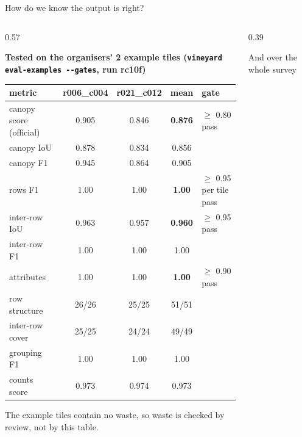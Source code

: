 \begin{frame}{How do we know the output is right?}
  \begin{columns}[T]
    \begin{column}{0.57\textwidth}
      {\scriptsize\bfseries\color{sxNight} Tested on the organisers' 2 example tiles (\texttt{vineyard eval-examples -{}-gates}, run rc10f)\par}
      \vspace{1mm}
      {\tiny
      \begin{tabular}{@{}l c c c l@{}}
        \toprule
        \textbf{metric} & \textbf{r006\_c004} & \textbf{r021\_c012} & \textbf{mean} & \textbf{gate}\\
        \midrule
        canopy score (official) & 0.905 & 0.846 & \textbf{0.876} & $\geq$ 0.80 \textcolor{sxTeal}{pass}\\
        canopy IoU              & 0.878 & 0.834 & 0.856 & \\
        canopy F1               & 0.945 & 0.864 & 0.905 & \\
        rows F1                 & 1.00 & 1.00 & \textbf{1.00} & $\geq$ 0.95 per tile \textcolor{sxTeal}{pass}\\
        inter-row IoU           & 0.963 & 0.957 & \textbf{0.960} & $\geq$ 0.95 \textcolor{sxTeal}{pass}\\
        inter-row F1            & 1.00 & 1.00 & 1.00 & \\
        attributes              & 1.00 & 1.00 & \textbf{1.00} & $\geq$ 0.90 \textcolor{sxTeal}{pass}\\
        \quad row structure     & 26/26 & 25/25 & 51/51 & \\
        \quad inter-row cover   & 25/25 & 24/24 & 49/49 & \\
        grouping F1             & 1.00 & 1.00 & 1.00 & \\
        counts score            & 0.973 & 0.974 & 0.973 & \\
        \bottomrule
      \end{tabular}\par}
      \vspace{1mm}
      {\tiny\color{sxGrey} The example tiles contain no waste, so waste is checked by review, not by this table.\par}
    \end{column}
    \begin{column}{0.39\textwidth}
      \begin{sxcard}{And over the whole survey}
        \begin{itemize}\setlength{\itemsep}{0.6mm}

\end{itemize}
\end{sxcard}
\end{column}
\end{columns}
\end{frame}
